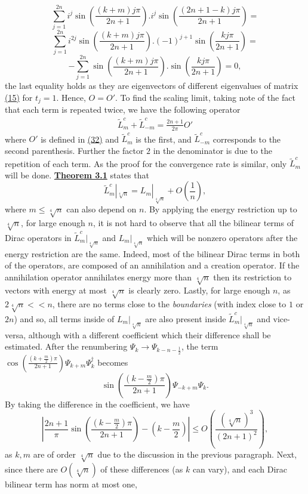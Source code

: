 \documentclass[twoside,11pt,titlepage]{amsart}
\renewcommand{\=}[1]{\stackrel{#1}{=}} %
\theoremstyle{definition}
\theoremstyle{remark}
\begin{document}
$$\sum_{j=1}^{2n} i^j\sin(\frac{(k+m)j\pi}{2n+1}).i^j\sin(\frac{(2n+1-k)j\pi}{2n+1})=$$
$$\sum_{j=1}^{2n} i^{2j}\sin(\frac{(k+m)j\pi}{2n+1}).(-1)^{j+1}\sin(\frac{kj\pi}{2n+1})=$$
$$-\sum_{j=1}^{2n} \sin(\frac{(k+m)j\pi}{2n+1}).\sin(\frac{kj\pi}{2n+1})=0,$$
the last equality holds as they are eigenvectors of different eigenvalues of matrix \hyperref[eq15]{(15)} for $t_j=1$. Hence, $O=O'$. To find the scaling limit, taking note of the fact that each term is repeated twice, we have the following operator
\begin{align}\label{eq33}
\widetilde{L}_m^c+\widetilde{L}_{-m}^c=\frac{2n+1}{2\pi}O'
\end{align}
where $O'$ is defined in \hyperref[eq32]{(32)} and $\widetilde{L}_m^c$ is the first, and $\widetilde{L}_{-m}^c$ corresponds to the second parenthesis. Further the factor $2$ in the denominator is due to the repetition of each term. As the proof for the convergence rate is similar, only $\widetilde{L}_{m}^c$ will be done. \hyperref[thm3.1]{\textbf{Theorem 3.1}} states that
$$\widetilde{L}_{m}^c|_{\sqrt[4]{n}}=L_{m}|_{\sqrt[4]{n}}+O(\frac{1}{n}),$$
where $m \le \sqrt[4]{n}$ can also depend on $n$. By applying the energy restriction up to $\sqrt[4]{n}$, for large enough $n$, it is not hard to observe that all the bilinear terms of Dirac operators in $\widetilde{L}_{m}^c|_{\sqrt[4]{n}}$ and $L_{m}|_{\sqrt[4]{n}}$ which will be nonzero operators after the energy restriction are the same. Indeed, most of the bilinear Dirac terms in both of the operators, are composed of an annihilation and a creation operator. If the annihilation operator annihilates energy more than $\sqrt[4]{n}$ then its restriction to vectors with energy at most $\sqrt[4]{n}$ is clearly zero. Lastly, for large enough $n$, as $2\sqrt[4]{n} < < n$, there are no terms close to the \textit{boundaries} (with index close to $1$ or $2n$) and so, all terms inside of $L_{m}|_{\sqrt[4]{n}}$ are also present inside $\widetilde{L}_{m}^c|_{\sqrt[4]{n}}$ and vice-versa, although with a different coefficient which their difference shall be estimated. After the renumbering $\Psi_k \to \Psi_{k-n-\frac{1}{2}}$, the term $\cos(\frac{(k+\frac{m}{2})\pi}{2n+1})\Psi_{k+m}\Psi_{k}^\dagger$ becomes 
$$\sin(\frac{(k-\frac{m}{2})\pi}{2n+1})\Psi_{-k+m}\Psi_{k}.$$
By taking the difference in the coefficient, we have
$$|\frac{2n+1}{\pi}\sin(\frac{(k-\frac{m}{2})\pi}{2n+1})-(k-\frac{m}{2})|\le O(\frac{(\sqrt[4]{n})^3}{(2n+1)^2}),$$
as $k,m$ are of order $\sqrt[4]{n}$ due to the discussion in the previous paragraph. Next, since there are $O(\sqrt[4]{n})$ of these differences (as $k$ can vary), and each Dirac bilinear term has norm at most one,
\end{document}
